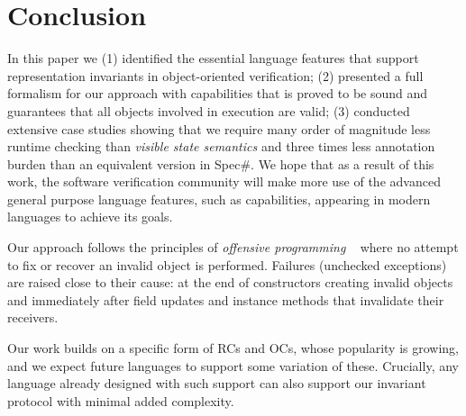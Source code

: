 
\section{Conclusion}
\label{s:conclusion}
In this paper we (1) identified the essential language features that support representation invariants in object-oriented verification; (2) presented a full formalism for our approach with capabilities that is proved to be sound and guarantees that all objects involved in execution are valid; (3) conducted extensive case studies
 showing that we require many order of magnitude less runtime checking than \textit{visible state semantics} and three times less annotation burden than an equivalent version in Spec\#. We hope that as a result of this work, the software verification community will make more use of the advanced general purpose language features, such as capabilities, appearing in modern languages to achieve its goals.

Our approach follows the principles of \emph{offensive programming}%
~\cite{stephens2015beginning} where
no attempt to fix or recover an invalid object is performed. 
Failures (unchecked exceptions)
		are raised close to their cause: at the end of constructors creating invalid objects and immediately after field updates and instance methods that invalidate their receivers.



Our work builds on a specific form of RCs and OCs, whose
popularity is growing, and we expect future languages to support some variation of these.
Crucially, any language already designed with such support
can also support our invariant protocol with minimal added complexity.



